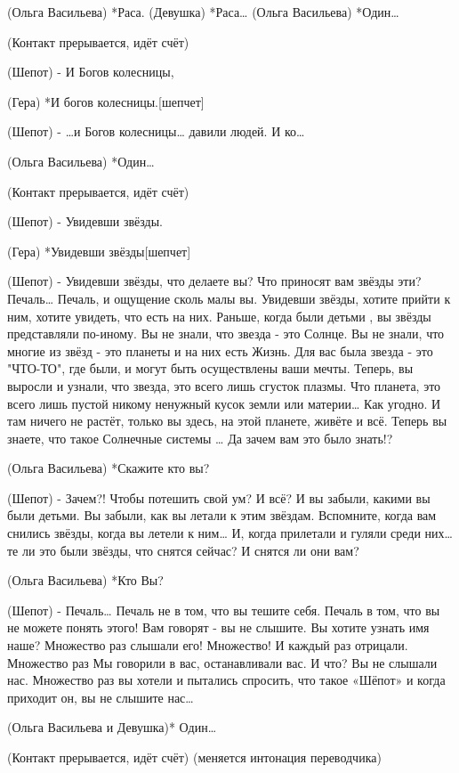 (Ольга Васильева) *Раса.
(Девушка) *Раса…
(Ольга Васильева) *Один…


(Контакт прерывается, идёт счёт)


(Шепот) -  И Богов колесницы,

(Гера) *И богов колесницы.[шепчет]

(Шепот) - …и  Богов колесницы… давили людей. И ко…

(Ольга Васильева) *Один…



(Контакт прерывается, идёт счёт)


(Шепот)  - Увидевши звёзды.

(Гера) *Увидевши звёзды[шепчет]

(Шепот)  - Увидевши звёзды, что делаете вы? Что приносят вам звёзды эти? Печаль… Печаль, и ощущение сколь малы вы. Увидевши звёзды, хотите прийти к ним, хотите увидеть, что есть на них. Раньше, когда  были детьми , вы звёзды представляли по-иному. Вы не знали, что звезда - это Солнце. Вы не знали, что многие из звёзд - это планеты и на них есть Жизнь. Для вас была звезда - это "ЧТО-ТО", где были, и могут быть осуществлены ваши мечты. Теперь, вы выросли и узнали, что звезда, это всего лишь сгусток плазмы. Что планета, это всего лишь пустой никому ненужный кусок земли или материи… Как угодно. И там ничего не растёт, только вы здесь, на этой планете, живёте и всё. Теперь вы знаете, что такое Солнечные системы …  Да зачем вам это было знать!? 

(Ольга Васильева) *Скажите кто вы?

(Шепот)  - Зачем?! Чтобы потешить свой ум? И всё? И вы забыли, какими вы были детьми. Вы забыли, как вы летали к этим звёздам. Вспомните, когда вам снились звёзды, когда вы летели к ним… И, когда прилетали и гуляли среди них… те ли это были звёзды, что снятся сейчас? И снятся ли они вам?

(Ольга Васильева) *Кто Вы?

(Шепот) - Печаль… Печаль не в том, что вы тешите себя. Печаль в том, что вы не можете понять этого! Вам говорят - вы не слышите. Вы хотите узнать имя наше? Множество раз слышали его! Множество! И каждый раз отрицали. Множество раз Мы говорили в вас, останавливали вас. И что? Вы не слышали нас. Множество раз вы хотели и пытались спросить, что такое «Шёпот» и когда приходит он, вы не слышите нас…

(Ольга Васильева и Девушка)* Один…



(Контакт прерывается, идёт счёт)
(меняется интонация переводчика)


